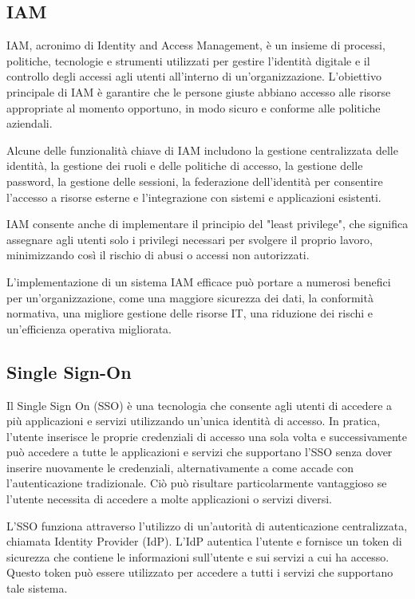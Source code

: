 \subsection{IAM}

IAM, acronimo di Identity and Access Management, è un insieme di processi, politiche, tecnologie e strumenti utilizzati per gestire l'identità digitale e il controllo degli accessi agli utenti all'interno di un'organizzazione. L'obiettivo principale di IAM è garantire che le persone giuste abbiano accesso alle risorse appropriate al momento opportuno, in modo sicuro e conforme alle politiche aziendali.

Alcune delle funzionalità chiave di IAM includono la gestione centralizzata delle identità, la gestione dei ruoli e delle politiche di accesso, la gestione delle password, la gestione delle sessioni, la federazione dell'identità per consentire l'accesso a risorse esterne e l'integrazione con sistemi e applicazioni esistenti.

IAM consente anche di implementare il principio del "least privilege", che significa assegnare agli utenti solo i privilegi necessari per svolgere il proprio lavoro, minimizzando così il rischio di abusi o accessi non autorizzati.

L'implementazione di un sistema IAM efficace può portare a numerosi benefici per un'organizzazione, come una maggiore sicurezza dei dati, la conformità normativa, una migliore gestione delle risorse IT, una riduzione dei rischi e un'efficienza operativa migliorata.
\subsection{Single Sign-On}


Il Single Sign On (SSO) è una tecnologia che consente agli utenti di accedere a più applicazioni e servizi utilizzando un'unica identità di accesso. In pratica, l'utente inserisce le proprie credenziali di accesso una sola volta e successivamente può accedere a tutte le applicazioni e servizi che supportano l'SSO senza dover inserire nuovamente le credenziali, alternativamente a come accade con l'autenticazione tradizionale. Ciò può risultare particolarmente vantaggioso se l'utente necessita di accedere a molte applicazioni o servizi diversi.

L'SSO funziona attraverso l'utilizzo di un'autorità di autenticazione centralizzata, chiamata Identity Provider (IdP). L'IdP autentica l'utente e fornisce un token di sicurezza che contiene le informazioni sull'utente e sui servizi a cui ha accesso. Questo token può essere utilizzato per accedere a tutti i servizi che supportano tale sistema.

